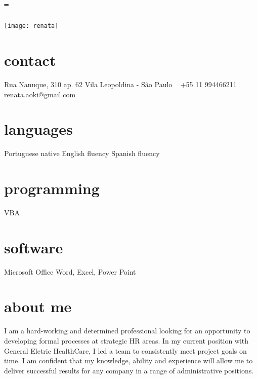 \documentclass[english]{cv-style}     %
\begin{document}
\lastupdated

\begin{aside}
\section{-}
\texttt{[image: renata]}
%
\section{contact}
Rua Nanuque, 310 ap. 62
Vila Leopoldina - São Paulo
~
+55 11 994466211
~
renata.aoki@gmail.com 
%
\section{languages}
Portuguese native
English fluency
Spanish fluency
%
\section{programming}
VBA
%
\section{software}
Microsoft Office Word, Excel, Power Point
%
\end{aside}
\vspace{0.3cm}
\section{about me}
  \vspace{-0.2cm}
I am a hard-working and determined professional looking for an opportunity to developing formal processes at strategic HR areas. In my current position with General Eletric HealthCare, I led a team to consistently meet project goals on time. I am confident that my knowledge, ability and experience will allow me to deliver successful results for any company in a range of administrative positions.
\end{document}
